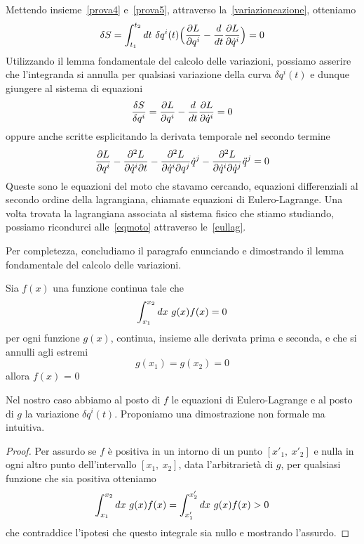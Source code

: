     Mettendo insieme~\eqref{prova4} e~\eqref{prova5}, attraverso la~\eqref{variazioneazione}, otteniamo
    \begin{equation*}
        \delta S = \int_{t_1}^{t_2}dt~ \delta q^i(t) \Big (\frac{\partial L}{\partial q^i}  - \frac{d}{dt} \frac{\partial L}{\partial\dot q^i} \Big) = 0
    \end{equation*}
    Utilizzando il lemma fondamentale del calcolo delle variazioni, possiamo asserire che l'integranda si annulla per qualsiasi variazione della curva $\delta q^i(t)$ e dunque giungere al sistema di equazioni
    \begin{equation} \label{eullag}
        \frac{\delta S}{\delta q^i} = \frac{\partial L}{\partial q^i}  - \frac{d}{dt} \frac{\partial L}{\partial\dot q^i} = 0
    \end{equation}
    oppure anche scritte esplicitando la derivata temporale nel secondo termine
    \begin{equation*} 
        \frac{\partial L}{\partial q^i}  - \frac{\partial^2 L}{\partial\dot q^i \partial t} - \frac{\partial^2 L}{\partial\dot q^i \partial q^j} \dot q^j - \frac{\partial^2 L}{\partial\dot q^i \partial\dot q^j} \ddot q^j = 0
    \end{equation*}
    Queste sono le equazioni del moto che stavamo cercando, equazioni differenziali al secondo ordine della lagrangiana, chiamate equazioni di Eulero-Lagrange. Una volta trovata la lagrangiana associata al sistema fisico che stiamo studiando, possiamo ricondurci alle~\eqref{eqmoto} attraverso le~\eqref{eullag}.

    \hfill 

    Per completezza, concludiamo il paragrafo enunciando e dimostrando il lemma fondamentale del calcolo delle variazioni.
    \begin{lemma}
        Sia $f(x)$ una funzione continua tale che 
    \begin{equation*}
        \int_{x_1}^{x_2}dx~ g(x) f(x) = 0 
    \end{equation*}
        per ogni funzione $g(x)$, continua, insieme alle derivata prima e seconda, e che si annulli agli estremi
    \begin{equation*}
        g(x_1) = g(x_2) = 0
    \end{equation*}
        allora $f(x)$ = 0
    \end{lemma}
    Nel nostro caso abbiamo al posto di $f$ le equazioni di Eulero-Lagrange e al posto di $g$ la variazione $\delta q^i(t)$. Proponiamo una dimostrazione non formale ma intuitiva.
    \begin{proof}
        Per assurdo se $f$ è positiva in un intorno di un punto $[x'_1, ~ x'_2]$ e nulla in ogni altro punto dell'intervallo $[x_1, ~ x_2]$, data l'arbitrarietà di $g$, per qualsiasi funzione che sia positiva otteniamo
    \begin{equation*}
        \int_{x_1}^{x_2}dx~ g(x) f(x) = \int_{x'_1}^{x'_2}dx~ g(x) f(x) > 0
    \end{equation*} 
        che contraddice l'ipotesi che questo integrale sia nullo e mostrando l'assurdo.
    \end{proof}

